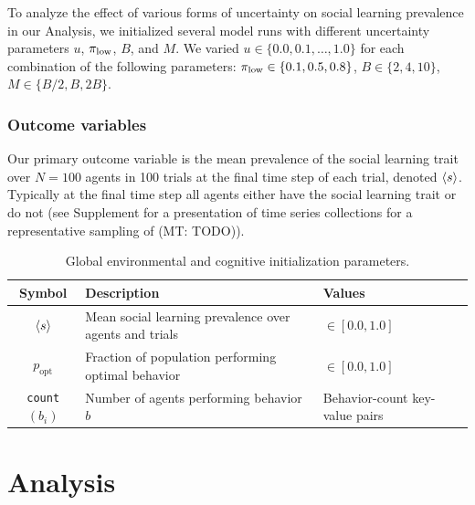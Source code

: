 \documentclass[letterpaper,11.5pt]{scrartcl}
\newcommand{\mt}[1]{{\textcolor{myorange} {({\tiny MT:} #1)}}}
\begin{document}
To analyze the effect of various forms of uncertainty on social learning 
prevalence in our Analysis, we initialized several model runs with
different uncertainty parameters $u$, $\pi_{\mathrm{\mathrm{low}}}$, $B$,
and $M$. We varied $u \in \{0.0, 0.1, \ldots, 1.0\}$ for each combination of
the following parameters:
$\pi_{\mathrm{low}} \in \{0.1, 0.5, 0.8\}$, $B \in \{2, 4, 10\}$, $M \in \{B/2, B, 2B\}$.

\subsubsection{Outcome variables}

Our primary outcome variable is the mean prevalence of the social learning
trait over $N=100$ agents in 100 trials at the final time step of each trial,
denoted $\langle s \rangle$.
Typically at the final time step all agents either have the social learning
trait or do not (see Supplement for a presentation of time series collections for
a representative sampling of \mt{TODO}).

\begin{table}[h]
    \caption{Global environmental and cognitive initialization parameters.}
    \label{tab:modelParameters}
    \centering \hspace{-3em}
    \begin{tabular}{cp{4.0in}l} \toprule

        Symbol & Description & Values \\ 

        \midrule  

        $\langle s \rangle$ & Mean social learning prevalence over agents and trials
                  & $\in [0.0, 1.0]$ \\

        $p_{\text{opt}}$ & Fraction of population performing optimal behavior
                         & $\in [0.0, 1.0]$ \\

        \texttt{count}$(b_i)$ & Number of agents performing behavior $b$ 
                              & Behavior-count key-value pairs\\
        \bottomrule
    \end{tabular}
\end{table}


\section{Analysis}
\end{document}
